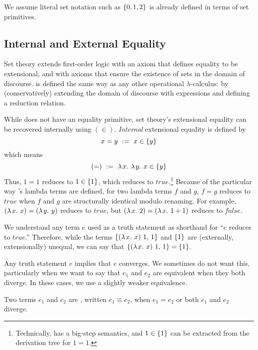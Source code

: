 \documentclass[preprint]{sigplanconf}
\begin{document}
We assume literal set notation such as $\{{0,1,2}\}$ is already defined in terms of set primitives.

\subsection{Internal and External Equality}

Set theory extends first-order logic with an axiom that defines equality to be extensional, and with axioms that ensure the existence of sets in the domain of discourse.
\lzfclang is defined the same way as any other operational $\lambda$-calculus: by (conservatively) extending the domain of discourse with expressions and defining a reduction relation.

While \lzfclang does not have an equality primitive, set theory's extensional equality can be recovered internally using $(\in)$.
\emph{Internal} extensional equality is defined by
\begin{equation}
	x = y \ := \ x \in \{{y}\}
\end{equation}
which means
\begin{equation}
	(=) \ := \ \lambda\mspace{2mu}{x}\ldotp\,\lambda\mspace{2mu}{y}\ldotp\,{x \in \{{y}\}}
\end{equation}
Thus, $1 = 1$ reduces to $1 \in \{{1}\}$, which reduces to $true$.\footnote{Technically, \lzfclang has a big-step semantics, and $1 \in \{{1}\}$ can be extracted from the derivation tree for $1 = 1$.}
Because of the particular way \lzfclang's lambda terms are defined, for two lambda terms $f$ and $g$, $f = g$ reduces to $true$ when $f$ and $g$ are structurally identical modulo renaming.
For example, $(\lambda\mspace{2mu}{x}\ldotp\,{x}) = (\lambda\mspace{2mu}{y}\ldotp\,{y})$ reduces to $true$, but $(\lambda\mspace{2mu}{x}\ldotp\,{2}) = (\lambda\mspace{2mu}{x}\ldotp\,{1+1})$ reduces to $false$.

We understand any \lzfclang term $\mathit{e}$ used as a truth statement as shorthand for ``$\mathit{e}$ reduces to $true$.''
Therefore, while the terms $\{{(\lambda\mspace{2mu}{x}\ldotp\,{x})~1,\,1}\}$ and $\{{1}\}$ are (externally, extensionally) unequal, we can say that $\{{(\lambda\mspace{2mu}{x}\ldotp\,{x})~1,\,1}\} = \{{1}\}$.

Any truth statement $\mathit{e}$ implies that $\mathit{e}$ converges.
We sometimes do not want this, particularly when we want to say that $\mathit{e_1}$ and $\mathit{e_2}$ are equivalent when they both diverge.
In these cases, we use a slightly weaker equivalence.

\begin{definition}
Two \lzfclang terms $\mathit{e_1}$ and $\mathit{e_2}$ are , written $\mathit{e_1} \equiv \mathit{e_2}$, when $\mathit{e_1} = \mathit{e_2}$ or both $\mathit{e_1}$ and $\mathit{e_2}$ diverge.
\end{definition}
\end{document}
